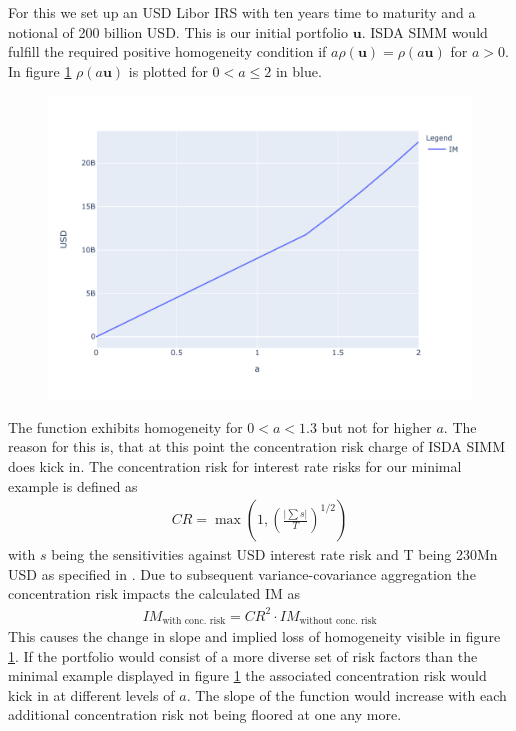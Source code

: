 \documentclass[../Thesis_AHoecherl.tex]{subfiles}
\begin{document}
    For this we set up an USD Libor IRS with ten years time to maturity and a notional of 200 billion USD. This is our initial portfolio $\mathbf{u}$. ISDA SIMM would fulfill the required positive homogeneity condition if $a \rho(\mathbf{u}) = \rho(a \mathbf{u})$ for $a>0$. In figure \ref{fig:homogeneity of ISDA SIMM} $\rho(a\mathbf{u})$ is plotted for $0<a\leq 2$ in blue. 
    \begin{figure}
        \centering
        \includegraphics{Graphics/ISDA_SIMM_homogenity.pdf}
        \caption{}
        \label{fig:homogeneity of ISDA SIMM}
    \end{figure}
    The function exhibits homogeneity for $0<a<1.3$ but not for higher $a$. 
    The reason for this is, that at this point the concentration risk charge of ISDA SIMM does kick in.
    The concentration risk for interest rate risks for our minimal example is defined as \cite[Article 7.b]{SIMM}
    \begin{align*}
        CR = \max\left(1,\left(\frac{\lvert\sum{s}\rvert}{T}\right)^{1/2}\right)
    \end{align*}
    with $s$ being the sensitivities against USD interest rate risk and T being 230Mn USD as specified in \cite[Article 74]{SIMM}. Due to subsequent variance-covariance aggregation the concentration risk impacts the calculated IM as
    \begin{align*}
        IM_{\text{with conc. risk}} = CR^2 \cdot IM_{\text{without conc. risk}}
    \end{align*}
    This causes the change in slope and implied loss of homogeneity visible in figure \ref{fig:homogeneity of ISDA SIMM}. If the portfolio would consist of a more diverse set of risk factors than the minimal example displayed in figure \ref{fig:homogeneity of ISDA SIMM} the associated concentration risk would kick in at different levels of $a$.
    The slope of the function would increase with each additional concentration risk not being floored at one any more. 
    
\end{document}
